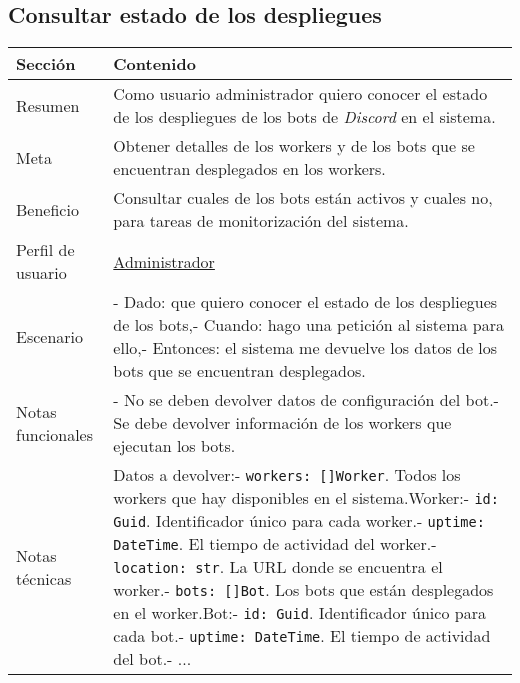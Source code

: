 \subsection{Consultar estado de los despliegues}

\begin{table}[H]
    \centering
    \def\arraystretch{1.25}
    \begin{adjustbox}{max width=\textwidth}
    \begin{tabularx}{\textwidth}{l|L}
    \hline
        \textbf{Sección} & \textbf{Contenido} \\ \hline
    \hline
        Resumen & Como usuario administrador quiero conocer el estado de los despliegues de los bots de \textit{Discord} en el sistema. \\ \hline
        Meta & Obtener detalles de los workers y de los bots que se encuentran desplegados en los workers. \\ \hline
        Beneficio & Consultar cuales de los bots están activos y cuales no, para tareas de monitorización del sistema. \\ \hline
        Perfil de usuario & \hyperref[sec:personaAdmin]{Administrador} \\ \hline
        Escenario & - Dado: que quiero conocer el estado de los despliegues de los bots,\linebreak - Cuando: hago una petición al sistema para ello,\linebreak - Entonces: el sistema me devuelve los datos de los bots que se encuentran desplegados. \\ \hline
        Notas funcionales & - No se deben devolver datos de configuración del bot.\linebreak - Se debe devolver información de los workers que ejecutan los bots. \\ \hline
        Notas técnicas & Datos a devolver:\linebreak - \verb|workers: []Worker|. Todos los workers que hay disponibles en el sistema.\linebreak \linebreak Worker:\linebreak - \verb|id: Guid|. Identificador único para cada worker.\linebreak - \verb|uptime: DateTime|. El tiempo de actividad del worker.\linebreak - \verb|location: str|. La URL donde se encuentra el worker.\linebreak - \verb|bots: []Bot|. Los bots que están desplegados en el worker.\linebreak \linebreak Bot:\linebreak - \verb|id: Guid|. Identificador único para cada bot.\linebreak - \verb|uptime: DateTime|. El tiempo de actividad del bot.\linebreak - ... \\ \hline

\end{tabularx}
\end{adjustbox}
\end{table}
